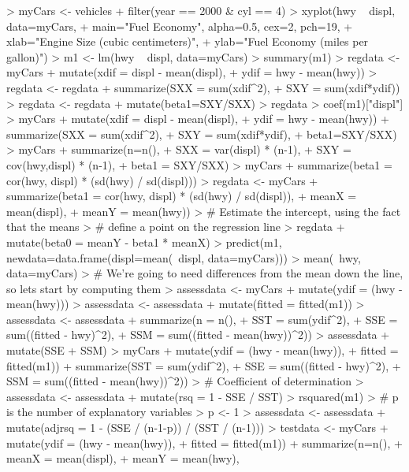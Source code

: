 \documentclass[10pt]{article}
\begin{document}
\begin{Schunk}
\begin{Sinput}
> myCars <- vehicles %
+   filter(year == 2000 & cyl == 4)
> xyplot(hwy ~ displ, data=myCars, 
+        main="Fuel Economy", alpha=0.5, cex=2, pch=19, 
+        xlab="Engine Size (cubic centimeters)",
+        ylab="Fuel Economy (miles per gallon)")
> m1 <- lm(hwy ~ displ, data=myCars)
> summary(m1)
> regdata <- myCars %
+   mutate(xdif = displ - mean(displ), 
+          ydif = hwy - mean(hwy))
> regdata <- regdata %
+   summarize(SXX = sum(xdif^2), 
+             SXY = sum(xdif*ydif))
> regdata <- regdata %
+   mutate(beta1=SXY/SXX)
> regdata
> coef(m1)["displ"]
> myCars %
+   mutate(xdif = displ - mean(displ), 
+          ydif = hwy - mean(hwy)) %
+   summarize(SXX = sum(xdif^2), 
+             SXY = sum(xdif*ydif),
+             beta1=SXY/SXX) 
> myCars %
+   summarize(n=n(),
+             SXX = var(displ) * (n-1),
+             SXY = cov(hwy,displ) * (n-1),
+             beta1 = SXY/SXX)
> myCars %
+   summarize(beta1 = cor(hwy, displ) * (sd(hwy) / sd(displ)))
> regdata <- myCars %
+   summarize(beta1 = cor(hwy, displ) * (sd(hwy) / sd(displ)),
+             meanX = mean(displ),
+             meanY = mean(hwy))
> # Estimate the intercept, using the fact that the means
> # define a point on the regression line
> regdata %
+   mutate(beta0 = meanY - beta1 * meanX)
> predict(m1, newdata=data.frame(displ=mean(~displ, data=myCars)))
> mean(~hwy, data=myCars)
> # We're going to need differences from the mean down the line, so lets start by computing them
> assessdata <- myCars %
+   mutate(ydif = (hwy - mean(hwy)))
> assessdata <- assessdata %
+   mutate(fitted = fitted(m1))
> assessdata <- assessdata %
+   summarize(n = n(),
+             SST = sum(ydif^2),
+             SSE = sum((fitted - hwy)^2),
+             SSM = sum((fitted - mean(hwy))^2))
> assessdata %
+   mutate(SSE + SSM)
> myCars %
+   mutate(ydif = (hwy - mean(hwy)),
+          fitted = fitted(m1))  %
+   summarize(SST = sum(ydif^2),
+             SSE = sum((fitted - hwy)^2),
+             SSM = sum((fitted - mean(hwy))^2))
> # Coefficient of determination
> assessdata <- assessdata %
+   mutate(rsq = 1 - SSE / SST)
> rsquared(m1)
> # p is the number of explanatory variables
> p <- 1
> assessdata <- assessdata %
+   mutate(adjrsq = 1 - (SSE / (n-1-p)) / (SST / (n-1)))
> testdata <- myCars %
+    mutate(ydif = (hwy - mean(hwy)),
+          fitted = fitted(m1)) %
+   summarize(n=n(),
+             meanX = mean(displ),
+             meanY = mean(hwy),

\end{Sinput}
\end{Schunk}
\end{document}
